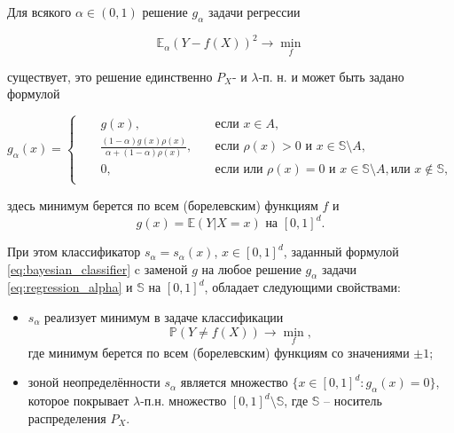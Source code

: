 \begin{theorem}
\label{theorem:modified_bayesian}
    Для всякого \(\alpha \in (0, 1)\) решение \(g_\alpha\) задачи регрессии

    \begin{equation}
        \label{eq:regression_alpha}
        \mathbb{E}_\alpha \left(Y - f(X)\right)^2 \rightarrow \min\limits_{f}
    \end{equation}
    
    \noindent существует, это решение единственно \(P_X\)- и \(\lambda\)-п. н. и может быть задано
формулой

    \begin{equation}
        \label{eq:classfier_alpha}
        g_\alpha(x) = \left\{
    \begin{alignedat}{2}
        &&g(x), \quad &\text{если } x \in A, \\
        &&\frac{(1-\alpha) g(x) \rho(x)}{\alpha + (1 - \alpha) \rho(x)}, \quad & \text{если } \rho(x) > 0 \text{ и } x \in \mathbb{S} \setminus A, \\
        &&0, \quad &\text{если или } \rho(x) = 0 \text{ и } x \in \mathbb{S} \setminus A, \text{или } x \notin \mathbb{S}, \\
    \end{alignedat}
    \right.
    \end{equation}
    
    \noindent здесь минимум берется по всем (борелевским) функциям \(f\) и
    \[g(x)=\mathbb{E}\left(Y|X=x\right) \text{ на } [0, 1]^d.\]
    
    \noindent При этом классификатор \(s_\alpha = s_\alpha(x)\), \(x \in [0, 1]^d\), заданный формулой \cref{eq:bayesian_classifier} c заменой \(g\) на любое решение \(g_\alpha\) задачи \cref{eq:regression_alpha} и \(\mathbb{S}\) на \([0, 1]^d\), обладает следующими свойствами:

    \begin{itemize}
        \item \(s_\alpha\) реализует минимум в задаче классификации
              \[\mathbb{P}(Y \neq f(X)) \rightarrow \min\limits_{f},\]
              \noindent где минимум берется по всем (борелевским) функциям со значениями \(\pm 1\);

        \item зоной неопределённости \(s_\alpha\) является множество \(\{x \in [0, 1]^d: g_\alpha(x) = 0\}\), которое покрывает \(\lambda\)-п.н. множество \([0, 1]^d \setminus \mathbb{S}\), где \(\mathbb{S}\) -- носитель распределения \(P_X\).
    \end{itemize}
\end{theorem}

